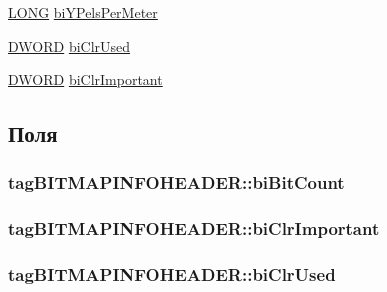 \begin{CompactItemize}
\item 
\hyperlink{filtration__run_2free_image_2_free_image_8h_27ec6163192f1e1e72d87421379ea3d4}{LONG} \hyperlink{structtag_b_i_t_m_a_p_i_n_f_o_h_e_a_d_e_r_c6226594275d045ff0d03849945d920f}{biYPelsPerMeter}
\item 
\hyperlink{filtration__run_2free_image_2_free_image_8h_f483253b2143078cede883fc3c111ad2}{DWORD} \hyperlink{structtag_b_i_t_m_a_p_i_n_f_o_h_e_a_d_e_r_dbf6bd52839895672030a734d2ae752f}{biClrUsed}
\item 
\hyperlink{filtration__run_2free_image_2_free_image_8h_f483253b2143078cede883fc3c111ad2}{DWORD} \hyperlink{structtag_b_i_t_m_a_p_i_n_f_o_h_e_a_d_e_r_637282b108fc8ac3bdf41479f9931ccb}{biClrImportant}
\end{CompactItemize}


\subsection{Поля}
\hypertarget{structtag_b_i_t_m_a_p_i_n_f_o_h_e_a_d_e_r_713c58f9cf7d5f115938d189d59fadf5}{
\subsubsection[{biBitCount}]{ {\bf tagBITMAPINFOHEADER::biBitCount}}}
\label{structtag_b_i_t_m_a_p_i_n_f_o_h_e_a_d_e_r_713c58f9cf7d5f115938d189d59fadf5}


\hypertarget{structtag_b_i_t_m_a_p_i_n_f_o_h_e_a_d_e_r_637282b108fc8ac3bdf41479f9931ccb}{
\subsubsection[{biClrImportant}]{ {\bf tagBITMAPINFOHEADER::biClrImportant}}}
\label{structtag_b_i_t_m_a_p_i_n_f_o_h_e_a_d_e_r_637282b108fc8ac3bdf41479f9931ccb}


\hypertarget{structtag_b_i_t_m_a_p_i_n_f_o_h_e_a_d_e_r_dbf6bd52839895672030a734d2ae752f}{
\subsubsection[{biClrUsed}]{ {\bf tagBITMAPINFOHEADER::biClrUsed}}}
\label{structtag_b_i_t_m_a_p_i_n_f_o_h_e_a_d_e_r_dbf6bd52839895672030a734d2ae752f}


